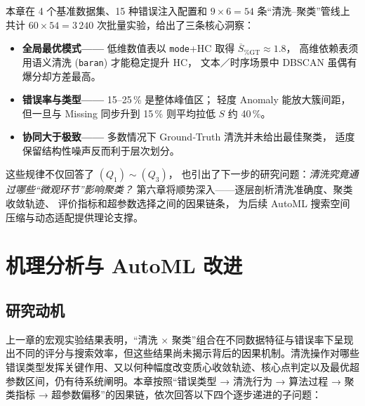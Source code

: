 \documentclass[10pt]{article} %
\numberwithin{equation}{section}
\begin{document}
本章在 4 个基准数据集、15 种错误注入配置和
\(9\times 6 = 54\) 条“清洗–聚类”管线上共计
\(60\times54 = 3\,240\) 次批量实验，给出了三条核心洞察：

\begin{itemize}[leftmargin=1.8em]
  \item \textbf{全局最优模式——} 低维数值表以
        \texttt{mode}+HC 取得 \(\overline{S}_{\%\text{GT}}\!\approx\!1.8\)，
        高维依赖表须用语义清洗 (\texttt{baran}) 才能稳定提升 HC，
        文本／时序场景中 DBSCAN 虽偶有爆分却方差最高。
  \item \textbf{错误率与类型——} 15–25\,\% 是整体峰值区；
        轻度 Anomaly 能放大簇间距，但一旦与 Missing 同步升到 15\,\%
        则平均拉低 \(S\) 约 40\,\%。
  \item \textbf{协同大于极致——} 多数情况下
        Ground‐Truth 清洗并未给出最佳聚类，
        适度保留结构性噪声反而利于层次划分。
\end{itemize}

这些规律不仅回答了 \((Q_1)\!\sim\!(Q_3)\)，
也引出了下一步的研究问题：\emph{清洗究竟通过哪些“微观环节”影响聚类？}  
第六章将顺势深入——逐层剖析清洗准确度、聚类收敛轨迹、
评价指标和超参数选择之间的因果链条，
为后续 AutoML 搜索空间压缩与动态适配提供理论支撑。

\section{机理分析与 AutoML 改进}
\label{sec:chapter6}

\subsection{研究动机}
\label{sec:motivation}

\textcolor[rgb]{0.00,0.07,1.00}{上一章的宏观实验结果表明，“清洗 × 聚类”组合在不同数据特征与错误率下呈现出不同的评分与搜索效率，但这些结果尚未揭示背后的因果机制。清洗操作对哪些错误类型发挥关键作用、又以何种幅度改变质心收敛轨迹、核心点判定以及最优超参数区间，仍有待系统阐明。本章按照“错误类型 → 清洗行为 → 算法过程 → 聚类指标 → 超参数偏移”的因果链，依次回答以下四个逐步递进的子问题：}
\end{document}

